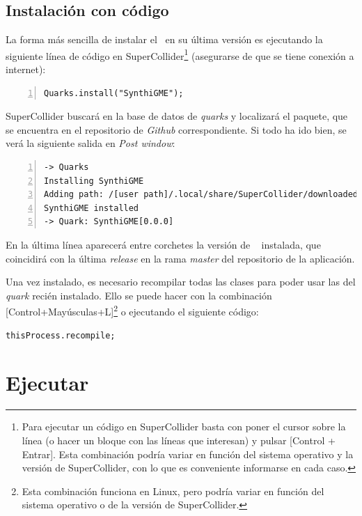 \subsection{Instalación con código}

La forma más sencilla de instalar el \appName~en su última versión es ejecutando la siguiente línea de código en SuperCollider\footnote{Para ejecutar un código en SuperCollider basta con poner el cursor sobre la línea (o hacer un bloque con las líneas que interesan) y pulsar [Control + Entrar]. Esta combinación podría variar en función del sistema operativo y la versión de SuperCollider, con lo que es conveniente informarse en cada caso.} (asegurarse de que se tiene conexión a internet):

\begin{lstlisting}[style=SuperCollider-IDE, frame=single, numbers=left]
Quarks.install("SynthiGME");
\end{lstlisting}

SuperCollider buscará en la base de datos de \textit{quarks} y localizará el paquete, que se encuentra en el repositorio de \textit{Github} correspondiente. Si todo ha ido bien, se verá la siguiente salida en \textit{Post window}:

\begin{lstlisting}[frame=single, numbers=left]
-> Quarks
Installing SynthiGME
Adding path: /[user path]/.local/share/SuperCollider/downloaded-quarks/SynthiGME
SynthiGME installed
-> Quark: SynthiGME[0.0.0]
\end{lstlisting}

En la última línea aparecerá entre corchetes la versión de \appName~ instalada, que coincidirá con la última \textit{release} en la rama \textit{master} del repositorio de la aplicación.

Una vez instalado, es necesario recompilar todas las clases para poder usar las del \textit{quark} recién instalado. Ello se puede hacer con la combinación [Control+Mayúsculas+L]\footnote{Esta combinación funciona en Linux, pero podría variar en función del sistema operativo o de la versión de SuperCollider.} o ejecutando el siguiente código:

\begin{lstlisting}[style=SuperCollider-IDE, frame=single]
thisProcess.recompile;
\end{lstlisting}


\section{Ejecutar \appName}
\label{ejecucion}

